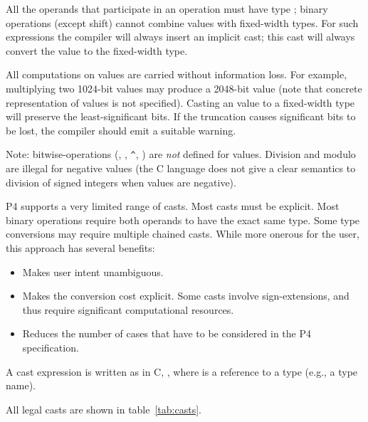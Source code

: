 \documentclass[12pt]{article}
\begin{document}
All the operands that participate in an operation must have type
\infint{}; binary operations (except shift) cannot combine \infint{}
values with fixed-width types.  For such expressions the compiler will
always insert an implicit cast; this cast will always convert the
\infint{} value to the fixed-width type.

All computations on \infint{} values are carried without information
loss.  For example, multiplying two 1024-bit values may produce a
2048-bit value (note that concrete representation of \infint{} values
is not specified). Casting an \infint{} value to a fixed-width type 
will preserve the least-significant bits.  If the truncation causes 
significant bits to be lost, the compiler should emit a suitable warning. 

Note: bitwise-operations (\code{|}, \code{\&}, \verb|^|, \code{\~{}})
are \emph{not} defined for \infint{} values.  Division and modulo are
illegal for negative values (the C language does not give a clear
semantics to division of signed integers when values are negative).



P4 supports a very limited range of casts.  Most casts must be
explicit.  Most binary operations require both operands to have the
exact same type.  Some type conversions may require multiple chained
casts.  While more onerous for the user, this approach has several
benefits:

\begin{itemize}
\item Makes user intent unambiguous.  
\item Makes the conversion cost explicit.  Some casts involve
  sign-extensions, and thus require significant computational
  resources.
\item Reduces the number of cases that have to be considered in the P4
  specification.
\end{itemize}

A cast expression is written as in C, , where
 is a reference to a type (e.g., a type name).

All legal casts are shown in table~\ref{tab:casts}.
\end{document}
